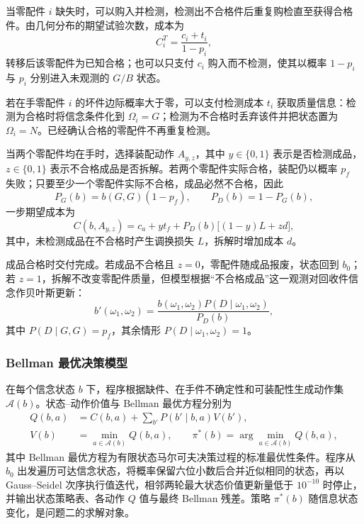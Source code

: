 当零配件 $i$ 缺失时，可以购入并检测，检测出不合格件后重复购检直至获得合格件。由几何分布的期望试验次数，成本为
\begin{equation}
  C_i^{T}=\frac{c_i+t_i}{1-p_i},
  \label{eq:q2-buy-test}
\end{equation}
转移后该零配件为已知合格；也可以只支付 $c_i$ 购入而不检测，使其以概率 $1-p_i$ 与 $p_i$ 分别进入未观测的 $G/B$ 状态。

若在手零配件 $i$ 的坏件边际概率大于零，可以支付检测成本 $t_i$ 获取质量信息：检测为合格时将信念条件化到 $\Omega_i=G$；检测为不合格时丢弃该件并把状态置为 $\Omega_i=N$。已经确认合格的零配件不再重复检测。

当两个零配件均在手时，选择装配动作 $A_{y,z}$，其中 $y\in\{0,1\}$ 表示是否检测成品，$z\in\{0,1\}$ 表示不合格成品是否拆解。若两个零配件实际合格，装配仍以概率 $p_f$ 失败；只要至少一个零配件实际不合格，成品必然不合格，因此
\begin{equation}
  P_G(b)=b(G,G)(1-p_f),\qquad P_D(b)=1-P_G(b),
  \label{eq:q2-product-quality}
\end{equation}
一步期望成本为
\begin{equation}
  C(b,A_{y,z})
  =c_a+yt_f+P_D(b)\bigl[(1-y)L+zd\bigr],
  \label{eq:q2-assembly-cost}
\end{equation}
其中，未检测成品在不合格时产生调换损失 $L$，拆解时增加成本 $d$。

成品合格时交付完成。若成品不合格且 $z=0$，零配件随成品报废，状态回到 $b_0$；若 $z=1$，拆解不改变零配件质量，但模型根据“不合格成品”这一观测对回收件信念作贝叶斯更新：
\begin{equation}
  b'(\omega_1,\omega_2)
  =\frac{b(\omega_1,\omega_2)P(D\mid\omega_1,\omega_2)}{P_D(b)},
  \label{eq:q2-bayes-update}
\end{equation}
其中 $P(D\mid G,G)=p_f$，其余情形 $P(D\mid\omega_1,\omega_2)=1$。

\subsubsection{Bellman 最优决策模型}

在每个信念状态 $b$ 下，程序根据缺件、在手件不确定性和可装配性生成动作集 $\mathcal A(b)$。状态--动作价值与 Bellman 最优方程分别为
\begin{align}
  Q(b,a)
  &=C(b,a)+\sum_{b'}P(b'\mid b,a)V(b'),
  \label{eq:q2-q-value}\\
  V(b)
  &=\min_{a\in\mathcal A(b)}Q(b,a),\qquad
  \pi^*(b)=\arg\min_{a\in\mathcal A(b)}Q(b,a),
  \label{eq:q2-bellman}
\end{align}
其中 Bellman 最优方程为有限状态马尔可夫决策过程的标准最优性条件\cite{mdp-puterman,dp-bertsekas}。程序从 $b_0$ 出发遍历可达信念状态，将概率保留六位小数后合并近似相同的状态，再以 Gauss--Seidel 次序执行值迭代，相邻两轮最大状态价值更新量低于 $10^{-10}$ 时停止，并输出状态策略表、各动作 $Q$ 值与最终 Bellman 残差。策略 $\pi^*(b)$ 随信息状态变化，是问题二的求解对象。

